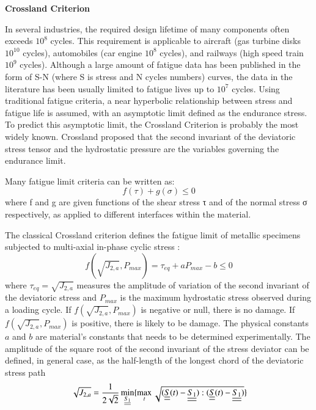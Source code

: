 \documentclass[3p,times,procedia,number]{elsarticle}
\begin{document}
\textbf{Crossland Criterion}

In several industries, the required design lifetime of many components often exceeds $ 10^8 $ cycles. This requirement is applicable to aircraft (gas turbine disks $ 10^{10} $ cycles), automobiles (car engine $ 10^8 $ cycles), and railways (high speed train $ 10^9 $ cycles). Although a large amount of fatigue data has been published in the form of S-N (where S is stress and N cycles numbers) curves, the data in the literature has been usually limited to fatigue lives up to $ 10^7 $ cycles. Using traditional fatigue criteria, a near hyperbolic relationship between stress and fatigue life is assumed, with an asymptotic limit defined as the endurance stress. To predict this asymptotic limit, the Crossland Criterion is probably the most widely known. Crossland proposed that the second invariant of the deviatoric stress tensor and the hydrostatic pressure are the variables governing the endurance limit. 

Many fatigue limit criteria can be written as:
\begin{equation}
	f(\tau)+g(\sigma) \leqslant 0
\end{equation}
where f and g are given functions of the shear stress τ and of the normal stress σ respectively, as applied to different interfaces within the material.  

The classical Crossland criterion defines the fatigue limit of metallic specimens subjected to multi-axial in-phase cyclic stress\cite{Crossland} : \begin{equation}f(\sqrt{J_{2,a}},P_{max})=\tau_{eq}+aP_{max}-b\leqslant 0\end{equation}
where $\tau_{eq}=\sqrt{J_{2,a}}$ measures  the amplitude of variation of the second invariant of the deviatoric stress  and $P_{max}$ is the maximum hydrostatic stress observed during a loading cycle. If $f(\sqrt{J_{2,a}},P_{max})$ is negative or null, there is no damage. If $f(\sqrt{J_{2,a}},P_{max})$ is positive, there is likely to be damage. The physical constants $a$ and $b$ are material's constants that needs to be determined experimentally. The amplitude of the square root of the second invariant of the stress deviator can be defined, in general case, as the half-length of the longest chord of the deviatoric stress path\cite{Papadopoulos1997219}
\begin{equation}\sqrt{J_{2,a}}=\frac{1}{2\sqrt{2}}\min \limits_{\uline{\uline{S_1}}}\{\max \limits_{t}\sqrt{(\uline{\uline{S}}(t)-\uline{\uline{S_1}}):(\uline{\uline{S}}(t)-\uline{\uline{S_1}})}\}\end{equation}
\end{document}
